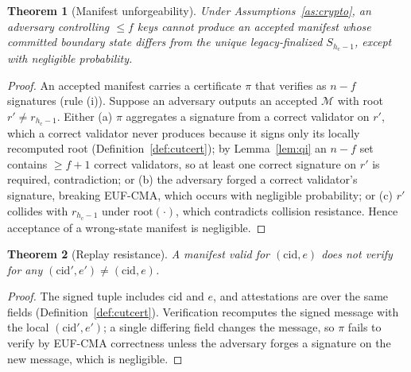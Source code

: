 \documentclass[journal]{IEEEtran}
\newtheorem{theorem}{Theorem}
\theoremstyle{definition}
\theoremstyle{remark}
\begin{document}
\begin{theorem}[Manifest unforgeability]
\label{th:unforge}
Under Assumptions~\ref{as:crypto}, an adversary controlling $\le f$ keys cannot produce an
accepted manifest whose committed boundary state differs from the unique legacy-finalized
$S_{h_{\mathrm{c}}-1}$, except with negligible probability.
\end{theorem}
\begin{proof}
An accepted manifest carries a certificate $\pi$ that verifies as $n-f$ signatures
(rule (i)). Suppose an adversary outputs an accepted $\mathcal{M}$ with root
$r'\ne r_{h_{\mathrm{c}}-1}$. Either (a) $\pi$ aggregates a signature from a correct validator on
$r'$, which a correct validator never produces because it signs only its locally recomputed root
(Definition~\ref{def:cutcert}); by Lemma~\ref{lem:qi} an $n-f$ set contains $\ge f+1$ correct
validators, so at least one correct signature on $r'$ is required, contradiction; or (b) the
adversary forged a correct validator's signature, breaking EUF-CMA, which occurs with negligible
probability; or (c) $r'$ collides with $r_{h_{\mathrm{c}}-1}$ under $\mathrm{root}(\cdot)$, which
contradicts collision resistance. Hence acceptance of a wrong-state manifest is negligible.
\end{proof}

\begin{theorem}[Replay resistance]
\label{th:replay}
A manifest valid for $(\mathrm{cid},e)$ does not verify for any $(\mathrm{cid}',e')\ne
(\mathrm{cid},e)$.
\end{theorem}
\begin{proof}
The signed tuple includes $\mathrm{cid}$ and $e$, and attestations are over the same fields
(Definition~\ref{def:cutcert}). Verification recomputes the signed message with the local
$(\mathrm{cid}',e')$; a single differing field changes the message, so $\pi$ fails to verify by
EUF-CMA correctness unless the adversary forges a signature on the new message, which is
negligible.
\end{proof}
\end{document}
